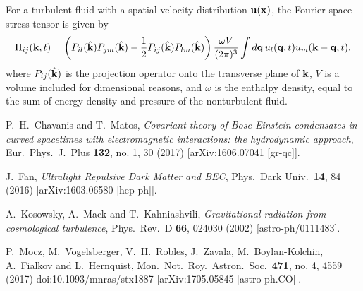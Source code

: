 \documentclass[onecolumn,nofootinbib,superscriptaddress]{revtex4}
\begin{document}
{For a turbulent fluid with a spatial velocity distribution $\bf{u}(\bf{x})$, the Fourier space stress tensor is given \cite{Kosowsky:2001xp} by
\begin{equation}
\Pi_{ij}({\bf{k}},t) = \left(P_{il}(\hat{\bf{k}})P_{jm}(\hat{\bf{k}})-\frac{1}{2}P_{ij}(\hat{\bf{k}})P_{lm}(\hat{\bf{k}})\right)\frac{\omega V}{(2\pi)^3}\int d{\bf{q}} \,u_l({\bf{q}},t)u_m({\bf{k}}-{\bf{q}},t),
\end{equation}
where $P_{ij}(\hat{\bf{k}})$ is the projection operator onto the transverse plane of ${\bf{k}}$, $V$ is a volume included for dimensional reasons, and $\omega$ is the enthalpy density, equal to the sum of energy density and pressure of the nonturbulent fluid.









\begin{thebibliography}{99}

  P.~H.~Chavanis and T.~Matos,
  \emph{Covariant theory of Bose-Einstein condensates in curved spacetimes with electromagnetic interactions: the hydrodynamic approach},
  Eur.\ Phys.\ J.\ Plus {\bf 132}, no. 1, 30 (2017)
  [arXiv:1606.07041 [gr-qc]].

  J.~Fan,
  \emph{Ultralight Repulsive Dark Matter and BEC},
  Phys.\ Dark Univ.\  {\bf 14}, 84 (2016)
  [arXiv:1603.06580 [hep-ph]].

  A.~Kosowsky, A.~Mack and T.~Kahniashvili,
  \emph{Gravitational radiation from cosmological turbulence},
  Phys.\ Rev.\ D {\bf 66}, 024030 (2002)
  [astro-ph/0111483].
  
  P.~Mocz, M.~Vogelsberger, V.~H.~Robles, J.~Zavala, M.~Boylan-Kolchin, A.~Fialkov and L.~Hernquist,
  Mon.\ Not.\ Roy.\ Astron.\ Soc.\  {\bf 471}, no. 4, 4559 (2017)
  doi:10.1093/mnras/stx1887
  [arXiv:1705.05845 [astro-ph.CO]].


\end{thebibliography}}
\end{document}
